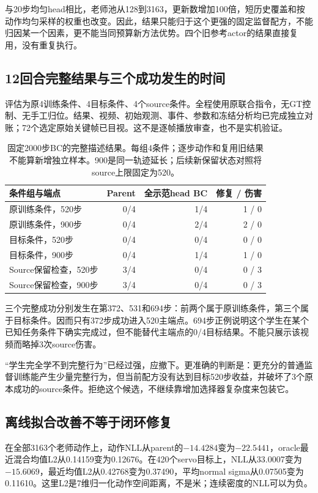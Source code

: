 \documentclass[UTF8,a4paper,fontset=none,zihao=-4]{ctexart}
\begin{document}
与20步均匀head相比，老师池从128到3163，更新数增加100倍，短历史覆盖和按动作均匀采样的权重也改变。因此，结果只能归于这个更强的固定监督配方，不能归因某一个因素，更不能当同预算新方法优势。四个旧参考actor的结果直接复用，没有重复执行。
\subsection{12回合完整结果与三个成功发生的时间}
评估为原4训练条件、4目标条件、4个source条件。全程使用原联合指令，无GT控制、无手工归位。结果、视频、初始观测、事件、参数和冻结分析均已完成独立对账；72个选定原始关键帧已目视。这不是逐帧播放审查，也不是实机验证。
\par
\begin{table}[htbp]\centering\small
\begin{tabularx}{\textwidth}{Yrrr}\toprule
条件组与端点 & Parent & 全示范head BC & 修复 / 伤害\\\midrule
原训练条件，520步 &0/4&1/4&1 / 0\\
原训练条件，900步 &0/4&2/4&2 / 0\\
目标条件，520步 &0/4&0/4&0 / 0\\
目标条件，900步 &0/4&1/4&1 / 0\\
Source保留检查，520步 &3/4&0/4&0 / 3\\
Source保留检查，900步 &3/4&0/4&0 / 3\\\bottomrule
\end{tabularx}
\caption{固定2000步BC的完整描述结果。每组4条件；逐步动作和复用旧结果不能算新增独立样本。900是同一轨迹延长；后续新保留状态对照将source上限固定为520。}
\end{table}
\par
三个完整成功分别发生在第372、531和694步：前两个属于原训练条件，第三个属于目标条件。因而只有372步成功进入520主端点。694步正例说明这个学生在某个已知任务条件下确实完成过，但不能替代主端点的0/4目标结果。不能只展示该视频而略掉3次source伤害。

\begin{keybox}[title=这一轮改变了什么判断]
“学生完全学不到完整行为”已经过强，应撤下。更准确的判断是：更充分的普通监督训练能产生少量完整行为，但当前配方没有达到目标520步收益，并破坏了3个原本成功的source条件。拒绝这个候选，不继续靠增加选择器复杂度来包装它。
\end{keybox}
\subsection{离线拟合改善不等于闭环修复}
在全部3163个老师动作上，动作NLL从parent的$-14.4284$变为$-22.5441$，oracle最近混合均值L2从0.14159变为0.12676。在420个servo目标上，NLL从33.0007变为$-15.6069$，最近均值L2从0.42768变为0.37490，平均normal sigma从0.07505变为0.11610。这里L2是7维归一化动作空间距离，不是米；连续密度的NLL可以为负。
\end{document}
